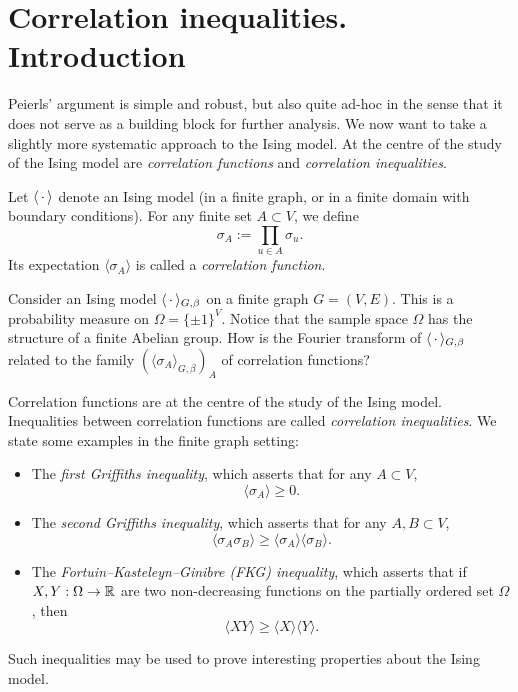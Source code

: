 \section{Correlation inequalities. Introduction}
\label{sec:correlation}

Peierls' argument is simple and robust, but also quite ad-hoc in the sense
that it does not serve as a building block for further analysis.
We now want to take a slightly more systematic approach to the Ising model.
At the centre of the study of the Ising model are \emph{correlation functions}
and \emph{correlation inequalities}.

Let $\langle\,\cdot\,\rangle$ denote an Ising model (in a finite graph,
or in a finite domain with boundary conditions).
For any finite set $A\subset V$, we define
\[
    \sigma_{A}:=\prod_{u\in A}\sigma_u.
\]
Its expectation $\langle\sigma_A\rangle$ is called a \emph{correlation function}.

\begin{exercise}
    Consider an Ising model $\langle\,\cdot\,\rangle_{G,\beta}$
    on a finite graph $G=(V,E)$.
    This is a probability measure on $\Omega=\{\pm1\}^V$.
    Notice that the sample space $\Omega$ has the structure of a finite Abelian group.
    How is the Fourier transform of $\langle\,\cdot\,\rangle_{G,\beta}$ related
    to the family $(\langle\sigma_A\rangle_{G,\beta})_A$ of correlation functions?
\end{exercise}

Correlation functions are at the centre of the study of the Ising model.
Inequalities between correlation functions are called \emph{correlation inequalities}.
We state some examples in the finite graph setting:
\begin{itemize}
    \item The \emph{first Griffiths inequality}, which asserts that for any $A\subset V$,
        \[
            \langle\sigma_A\rangle\geq 0.
        \]
    \item The \emph{second Griffiths inequality}, which asserts that for any $A,B\subset V$,
    \[
        \langle\sigma_A\sigma_B\rangle
        \geq
        \langle\sigma_A\rangle\langle\sigma_B\rangle.
    \]
    \item The \emph{Fortuin--Kasteleyn--Ginibre (FKG) inequality}, which asserts that
    if $X,Y:\Omega\to\mathbb R$ are two non-decreasing functions on the partially ordered set $\Omega$,
    then
    \[
        \langle XY\rangle
        \geq
        \langle X\rangle\langle Y\rangle.
    \]    
\end{itemize}
Such inequalities may be used to prove interesting properties about the Ising model.

\begin{remark}
\end{remark}

\begin{exercise}

\end{exercise}


